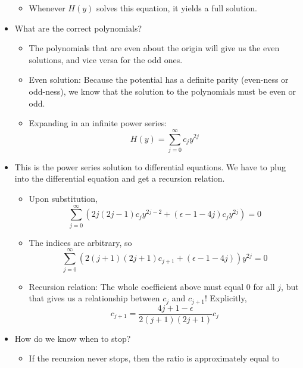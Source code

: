 \documentclass[../notes.tex]{subfiles}
\begin{document}
\begin{itemize}
    \begin{itemize}
        \item Whenever $H(y)$ solves this equation, it yields a full solution.
    \end{itemize}
    \item What are the correct polynomials?
    \begin{itemize}
        \item The polynomials that are even about the origin will give us the even solutions, and vice versa for the odd ones.
        \item Even solution: Because the potential has a definite parity (even-ness or odd-ness), we know that the solution to the polynomials must be even or odd.
        \item Expanding in an infinite power series:
        \begin{equation*}
            H(y) = \sum_{j=0}^\infty c_jy^{2j}
        \end{equation*}
    \end{itemize}
    \item This is the power series solution to differential equations. We have to plug into the differential equation and get a recursion relation.
    \begin{itemize}
        \item Upon substitution,
        \begin{equation*}
            \sum_{j=0}^\infty\left( 2j(2j-1)c_jy^{2j-2}+(\epsilon-1-4j)c_jy^{2j} \right) = 0
        \end{equation*}
        \item The indices are arbitrary, so
        \begin{equation*}
            \sum_{j=0}^\infty(2(j+1)(2j+1)c_{j+1}+(\epsilon-1-4j))y^{2j} = 0
        \end{equation*}
        \item Recursion relation: The whole coefficient above must equal 0 for all $j$, but that gives us a relationship between $c_j$ and $c_{j+1}$! Explicitly,
        \begin{equation*}
            c_{j+1} = \frac{4j+1-\epsilon}{2(j+1)(2j+1)}c_j
        \end{equation*}
    \end{itemize}
    \item How do we know when to stop?
    \begin{itemize}
        \item If the recursion never stops, then the ratio is approximately equal to

\end{itemize}
\end{itemize}
\end{document}

